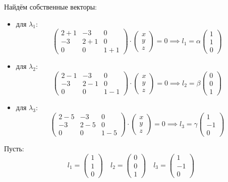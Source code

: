 Найдём собственные векторы:
\begin{itemize}
\item для \(λ_1\):
\[
  \begin{pmatrix}
    2 + 1 & -3 & 0 \\
    -3 & 2 + 1 & 0 \\
    0 & 0 & 1 + 1
  \end{pmatrix} \cdot
  \begin{pmatrix}
    x \\
    y \\
    z
  \end{pmatrix}
  = 0
  \implies
  l_1 = α
  \begin{pmatrix}
    1 \\
    1 \\
    0
  \end{pmatrix}
\]
\item для \(λ_2\):
\[
  \begin{pmatrix}
    2 - 1 & -3 & 0 \\
    -3 & 2 - 1 & 0 \\
    0 & 0 & 1 - 1
  \end{pmatrix} \cdot
  \begin{pmatrix}
    x \\
    y \\
    z
  \end{pmatrix}
  = 0
  \implies
  l_2 = β
  \begin{pmatrix}
    0 \\
    0 \\
    1
  \end{pmatrix}
\]
\item для \(λ_3\):
\[
  \begin{pmatrix}
    2 - 5 & -3 & 0 \\
    -3 & 2 - 5 & 0 \\
    0 & 0 & 1 - 5
  \end{pmatrix} \cdot
  \begin{pmatrix}
    x \\
    y \\
    z
  \end{pmatrix}
  = 0
  \implies
  l_3 = γ
  \begin{pmatrix}
    1 \\
    -1 \\
    0
  \end{pmatrix}
\]
\end{itemize}
Пусть:
\[
  l_1 =
  \begin{pmatrix}
    1 \\
    1 \\
    0
  \end{pmatrix} \quad
  l_2 =
  \begin{pmatrix}
    0 \\
    0 \\
    1
  \end{pmatrix} \quad
  l_3 =
  \begin{pmatrix}
    1 \\
    -1 \\
    0
  \end{pmatrix}
\]
